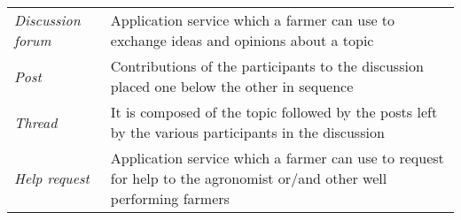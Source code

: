 \begin{center}
\begin{longtable}{|m{3.2cm}|m{8.3cm}|}
\textit{Discussion forum} & Application service which a farmer can use to exchange ideas and opinions about a topic\\
\textit{Post} & Contributions of the participants to the discussion placed one below the other in sequence\\
\textit{Thread} & It is composed of the topic followed by the posts left by the various participants in the discussion\\
\textit{Help request} & Application service which a farmer can use to request for help to the agronomist or/and other well performing farmers\\
\end{longtable}
\end{center}